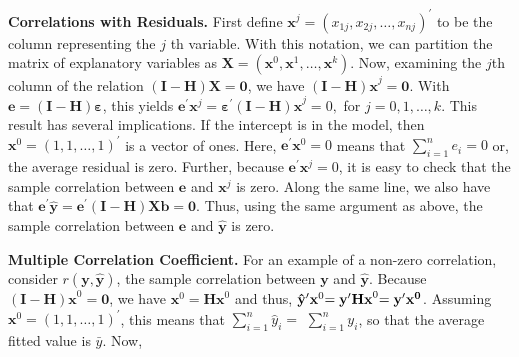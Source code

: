 \textbf{Correlations with Residuals.} First define $\mathbf{x}%
^{j}=(x_{1j},x_{2j},\dots,x_{nj})^{\prime}$ to be the column
representing the $j$ th variable. With this notation, we can
partition the matrix of explanatory variables as $\mathbf{X}=\left(
\mathbf{x}^{0},\mathbf{x}^{1},\dots,\mathbf{x}^{k} \right)$. Now,
examining the $j$th column of the relation $\mathbf{(I-H)X}=
\mathbf{0}$, we have $\mathbf{(I-H)x}^{j}=\mathbf{0}$. With
$\mathbf{e}=\mathbf{(I-H) \boldsymbol \varepsilon}$, this yields $
\mathbf{e}^{\prime}\mathbf{x}^{j}=\boldsymbol
\varepsilon^{\prime}\mathbf{(I-H)x} ^{j}=0,$ for $j=0,1,\ldots,k.$
This result has several implications. If the intercept is in the
model, then $\mathbf{x}^{0}=(1,1,\ldots,1)^{\prime}$ is a vector of
ones. Here, $\mathbf{e}^{\prime}\mathbf{x}^{0}=0$ means that
$\sum_{i=1}^{n} e_i=0$ or, the average residual is zero. Further,
because $\mathbf{e}^{\prime} \mathbf{x}^{j}=0$, it is easy to check
that the sample correlation between $\mathbf{e}$ and
$\mathbf{x}^{j}$ is zero. Along the same line, we also have that
$\mathbf{e}^{\prime}\mathbf{\hat{y}}=\mathbf{e}^{\prime}
\mathbf{(I-H)Xb}=\mathbf{0}$. Thus, using the same argument as
above, the sample correlation between $\mathbf{e}$ and
$\mathbf{\hat{y}}$ is zero.


\textbf{Multiple Correlation Coefficient.} For an example of a
non-zero correlation, consider $r(\mathbf{y,\hat{y}})$, the sample
correlation
between $\mathbf{y}$ and $\mathbf{\hat{y}}$. Because $\mathbf{(I-H)x}^{0}=%
\mathbf{0}$, we have $\mathbf{x}^{0}=\mathbf{Hx}^{0}$ and thus, $\mathbf{%
\hat{y}}^{\prime}\mathbf{x}^{0}\mathbf{=y}^{\prime}\mathbf{Hx}^{0}\mathbf{%
=y^{\prime} x^{0}}$. Assuming
$\mathbf{x}^{0}=(1,1,\ldots,1)^{\prime}$, this means that
$\sum_{i=1}^{n}\hat{y}_i=$ $\sum_{i=1}^{n}y_i$, so that the average
fitted value is $\bar{y}$. Now,


